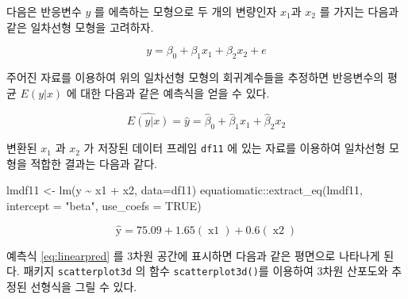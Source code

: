 \documentclass[
]{book}
\newenvironment{Shaded}{\begin{snugshade}}{\end{snugshade}}
\newcommand{\AttributeTok}[1]{\textcolor[rgb]{0.77,0.63,0.00}{#1}}
\newcommand{\ConstantTok}[1]{\textcolor[rgb]{0.00,0.00,0.00}{#1}}
\newcommand{\DecValTok}[1]{\textcolor[rgb]{0.00,0.00,0.81}{#1}}
\newcommand{\FunctionTok}[1]{\textcolor[rgb]{0.00,0.00,0.00}{#1}}
\newcommand{\NormalTok}[1]{#1}
\newcommand{\OtherTok}[1]{\textcolor[rgb]{0.56,0.35,0.01}{#1}}
\newcommand{\SpecialCharTok}[1]{\textcolor[rgb]{0.00,0.00,0.00}{#1}}
\newcommand{\StringTok}[1]{\textcolor[rgb]{0.31,0.60,0.02}{#1}}
\theoremstyle{definition}
\theoremstyle{definition}
\theoremstyle{definition}
\theoremstyle{definition}
\theoremstyle{remark}
\begin{document}
다음은 반응변수 \(y\) 를 에측하는 모형으로 두 개의 변량인자 \(x_1\)과 \(x_2\) 를 가지는 다음과 같은 일차선형 모형을 고려하자.

\begin{equation}
y = \beta_0 + \beta_1 x_1 + \beta_2 x_2 +  e 
\label{eq:linearmodel}
\end{equation}

주어진 자료를 이용하여 위의 일차선형 모형의 회귀계수들을 추정하면 반응변수의 평균 \(E(y|x)\) 에 대한 다음과 같은 예측식을 얻을 수 있다.

\begin{equation}
\widehat {E(y|x)} = \hat y = \hat \beta_0 + \hat \beta_1 x_1 + \hat \beta_2 x_2
\label{eq:linearpred}
\end{equation}

변환된 \(x_1\) 과 \(x_2\) 가 저장된 데이터 프레임 \texttt{df11} 에 있는 자료를 이용하여 일차선형 모형을 적합한 결과는 다음과 같다.

\begin{Shaded}
\begin{Highlighting}[]
\NormalTok{lmdf11 }\OtherTok{\textless{}{-}} \FunctionTok{lm}\NormalTok{(y }\SpecialCharTok{\textasciitilde{}}\NormalTok{ x1 }\SpecialCharTok{+}\NormalTok{ x2, }\AttributeTok{data=}\NormalTok{df11)}
\NormalTok{equatiomatic}\SpecialCharTok{::}\FunctionTok{extract\_eq}\NormalTok{(lmdf11, }\AttributeTok{intercept =} \StringTok{"beta"}\NormalTok{, }\AttributeTok{use\_coefs =} \ConstantTok{TRUE}\NormalTok{)}
\end{Highlighting}
\end{Shaded}

\[
\operatorname{\widehat{y}} = 75.09 + 1.65(\operatorname{x1}) + 0.6(\operatorname{x2})
\]

예측식 \eqref{eq:linearpred} 를 3차원 공간에 표시하면 다음과 같은 평면으로 나타나게 된다. 패키지 \texttt{scatterplot3d} 의 함수
\texttt{scatterplot3d()}를 이용하여 3차원 산포도와 추정된 선형식을 그릴 수 있다.

\begin{Shaded}
\end{Shaded}
\end{document}
